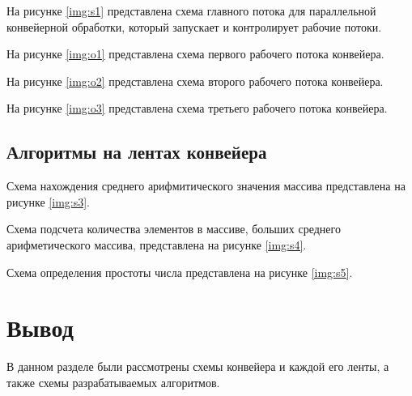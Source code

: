 На рисунке \ref{img:s1} представлена схема главного потока для параллельной конвейерной обработки, который запускает и контролирует рабочие потоки.

\clearpage

На рисунке \ref{img:o1} представлена схема первого рабочего потока конвейера. 

\clearpage

На рисунке \ref{img:o2} представлена схема второго рабочего потока конвейера. 

\clearpage

На рисунке \ref{img:o3} представлена схема третьего рабочего потока конвейера. 

\clearpage


\subsection{Алгоритмы на лентах конвейера}

Схема нахождения среднего арифмитического значения массива представлена на рисунке \ref{img:s3}.



\clearpage


Схема подсчета количества элементов в массиве, больших среднего арифметического массива, представлена на рисунке \ref{img:s4}.


\clearpage


Схема определения простоты числа представлена на рисунке \ref{img:s5}.



\section{Вывод}

В данном разделе были рассмотрены схемы конвейера и каждой его ленты, а также схемы разрабатываемых алгоритмов.
